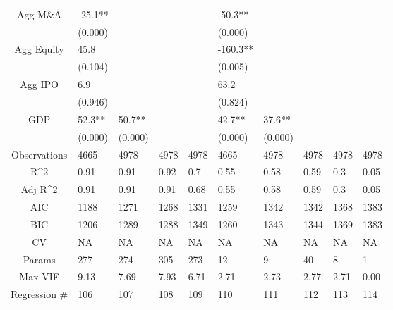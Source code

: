 \documentclass{article}
\begin{document}
\begin{table}[H]
\begin{tabular}{|clllllllll|}
  Agg M\&A & -25.1** &  &  &  & -50.3** &  &  &  &  \\ 
   & (0.000) &  &  &  & (0.000) &  &  &  &  \\ 
  Agg Equity & 45.8 &  &  &  & -160.3** &  &  &  &  \\ 
   & (0.104) &  &  &  & (0.005) &  &  &  &  \\ 
  Agg IPO & 6.9 &  &  &  & 63.2 &  &  &  &  \\ 
   & (0.946) &  &  &  & (0.824) &  &  &  &  \\ 
  GDP & 52.3** & 50.7** &  &  & 42.7** & 37.6** &  &  &  \\ 
   & (0.000) & (0.000) &  &  & (0.000) & (0.000) &  &  &  \\ 
  \hline 
 Observations & 4665 & 4978 & 4978 & 4978 & 4665 & 4978 & 4978 & 4978 & 4978 \\ 
  R^2 & 0.91 & 0.91 & 0.92 & 0.7 & 0.55 & 0.58 & 0.59 & 0.3 & 0.05 \\ 
  Adj R^2 & 0.91 & 0.91 & 0.91 & 0.68 & 0.55 & 0.58 & 0.59 & 0.3 & 0.05 \\ 
  AIC & 1188 & 1271 & 1268 & 1331 & 1259 & 1342 & 1342 & 1368 & 1383 \\ 
  BIC & 1206 & 1289 & 1288 & 1349 & 1260 & 1343 & 1344 & 1369 & 1383 \\ 
  CV & NA & NA & NA & NA & NA & NA & NA & NA & NA \\ 
  Params & 277 & 274 & 305 & 273 & 12 & 9 & 40 & 8 & 1 \\ 
  Max VIF & 9.13 & 7.69 & 7.93 & 6.71 & 2.71 & 2.73 & 2.77 & 2.71 & 0.00 \\ 
  Regression \# & 106 & 107 & 108 & 109 & 110 & 111 & 112 & 113 & 114 \\ 
   \hline
\end{tabular}
 
\end{table}
\end{document}
